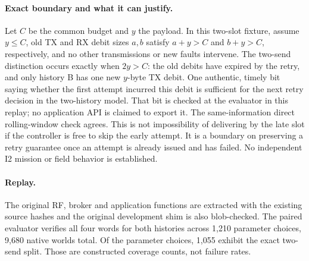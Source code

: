 \documentclass[11pt]{article}
\begin{document}
\paragraph{Exact boundary and what it can justify.}
Let \(C\) be the common budget and \(y\) the payload. In this two-slot fixture, assume \(y\leq C\), old TX and RX debit sizes \(a,b\) satisfy \(a+y>C\) and \(b+y>C\), respectively, and no other transmissions or new faults intervene. The two-send distinction occurs exactly when \(2y>C\): the old debits have expired by the retry, and only history B has one new \(y\)-byte TX debit. One authentic, timely bit saying whether the first attempt incurred this debit is sufficient for the next retry decision in the two-history model. That bit is checked at the evaluator in this replay; no application API is claimed to export it. The same-information direct rolling-window check agrees. This is not impossibility of delivering by the late slot if the controller is free to skip the early attempt. It is a boundary on preserving a retry guarantee once an attempt is already issued and has failed. No independent I2 mission or field behavior is established.
\paragraph{Replay.}
The original RF, broker and application functions are extracted with the existing source hashes and the original development shim is also blob-checked. The paired evaluator verifies all four words for both histories across 1,210 parameter choices, 9,680 native worlds total. Of the parameter choices, 1,055 exhibit the exact two-send split. Those are constructed coverage counts, not failure rates.
\end{document}
